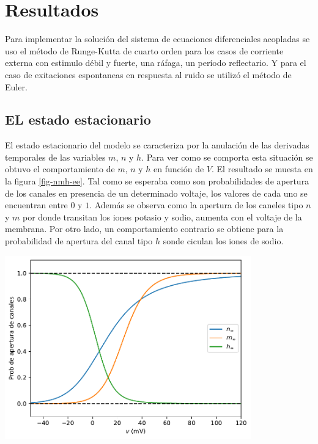 \documentclass[aps,prl,reprint,groupedaddress]{revtex4-2}
\newenvironment{Figura}
  {\par\medskip\noindent\minipage{\linewidth}}
  {\endminipage\par\medskip}
\begin{document}
\section{Resultados}

Para implementar la solución del sistema de ecuaciones diferenciales acopladas 
se uso el método de Runge-Kutta de cuarto orden para los casos de corriente 
externa con estimulo débil y fuerte, una ráfaga, un período reflectario. Y para 
el caso de exitaciones espontaneas en respuesta al ruido se utilizó el método de
Euler.

\subsection{EL estado estacionario}

El estado estacionario del modelo se caracteriza por la anulación de las 
derivadas temporales de las variables $m$, $n$ y $h$. Para ver como se comporta 
esta situación se obtuvo el comportamiento de $m$, $n$ y $h$ en función de $V$.
El resultado se muesta en la figura \ref{fig-nmh-ee}. Tal como se esperaba 
como son probabilidades de apertura de los canales en presencia de un determinado 
voltaje, los valores de cada uno se encuentran entre $0$ y $1$. Además se observa 
como la apertura de los caneles tipo $n$ y $m$ por donde transitan los iones 
potasio y sodio, aumenta con el voltaje de la membrana. Por otro lado, un 
comportamiento contrario se obtiene para la probabilidad de apertura del canal 
tipo $h$ sonde ciculan los iones de sodio.

\begin{Figura}
    \centering
    \includegraphics[width=0.8\textwidth]{figs/nmh_ee.pdf}
    \label{fig-nmh-ee}
\end{Figura}
\end{document}
